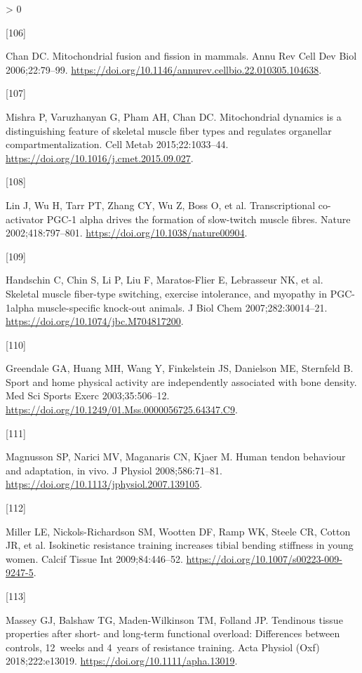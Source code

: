 \documentclass[twoside,10pt]{gihclass} %
\newlength{\cslhangindent}
\newlength{\csllabelwidth}
\newenvironment{CSLReferences}[3] %
 {%
  \setlength{\parindent}{0pt}
  \ifodd #1 \everypar{\setlength{\hangindent}{\cslhangindent}}\ignorespaces\fi
  \ifnum #2 > 0
  \setlength{\parskip}{#2\baselineskip}
  \fi
 }%
 {}
\newcommand{\CSLLeftMargin}[1]{\parbox[t]{\maxof{\widthof{#1}}{\csllabelwidth}}{#1}}
\newcommand{\CSLRightInline}[1]{\parbox[t]{\linewidth}{#1}}
\begin{document}
\begin{CSLReferences}{0}{0}
\leavevmode\hypertarget{ref-RN2817}{}%
\CSLLeftMargin{{[}106{]} }
\CSLRightInline{Chan DC. Mitochondrial fusion and fission in mammals. Annu Rev Cell Dev Biol 2006;22:79--99. \url{https://doi.org/10.1146/annurev.cellbio.22.010305.104638}.}

\leavevmode\hypertarget{ref-RN2816}{}%
\CSLLeftMargin{{[}107{]} }
\CSLRightInline{Mishra P, Varuzhanyan G, Pham AH, Chan DC. Mitochondrial dynamics is a distinguishing feature of skeletal muscle fiber types and regulates organellar compartmentalization. Cell Metab 2015;22:1033--44. \url{https://doi.org/10.1016/j.cmet.2015.09.027}.}

\leavevmode\hypertarget{ref-RN2818}{}%
\CSLLeftMargin{{[}108{]} }
\CSLRightInline{Lin J, Wu H, Tarr PT, Zhang CY, Wu Z, Boss O, et al. Transcriptional co-activator PGC-1 alpha drives the formation of slow-twitch muscle fibres. Nature 2002;418:797--801. \url{https://doi.org/10.1038/nature00904}.}

\leavevmode\hypertarget{ref-RN2819}{}%
\CSLLeftMargin{{[}109{]} }
\CSLRightInline{Handschin C, Chin S, Li P, Liu F, Maratos-Flier E, Lebrasseur NK, et al. Skeletal muscle fiber-type switching, exercise intolerance, and myopathy in PGC-1alpha muscle-specific knock-out animals. J Biol Chem 2007;282:30014--21. \url{https://doi.org/10.1074/jbc.M704817200}.}

\leavevmode\hypertarget{ref-RN2775}{}%
\CSLLeftMargin{{[}110{]} }
\CSLRightInline{Greendale GA, Huang MH, Wang Y, Finkelstein JS, Danielson ME, Sternfeld B. Sport and home physical activity are independently associated with bone density. Med Sci Sports Exerc 2003;35:506--12. \url{https://doi.org/10.1249/01.Mss.0000056725.64347.C9}.}

\leavevmode\hypertarget{ref-RN2771}{}%
\CSLLeftMargin{{[}111{]} }
\CSLRightInline{Magnusson SP, Narici MV, Maganaris CN, Kjaer M. Human tendon behaviour and adaptation, in vivo. J Physiol 2008;586:71--81. \url{https://doi.org/10.1113/jphysiol.2007.139105}.}

\leavevmode\hypertarget{ref-RN2774}{}%
\CSLLeftMargin{{[}112{]} }
\CSLRightInline{Miller LE, Nickols-Richardson SM, Wootten DF, Ramp WK, Steele CR, Cotton JR, et al. Isokinetic resistance training increases tibial bending stiffness in young women. Calcif Tissue Int 2009;84:446--52. \url{https://doi.org/10.1007/s00223-009-9247-5}.}

\leavevmode\hypertarget{ref-RN2772}{}%
\CSLLeftMargin{{[}113{]} }
\CSLRightInline{Massey GJ, Balshaw TG, Maden-Wilkinson TM, Folland JP. Tendinous tissue properties after short- and long-term functional overload: Differences between controls, 12~weeks and 4~years of resistance training. Acta Physiol (Oxf) 2018;222:e13019. \url{https://doi.org/10.1111/apha.13019}.}


\end{CSLReferences}
\end{document}
